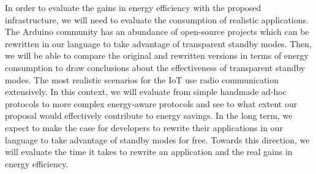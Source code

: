 \documentclass[12pt,english]{amsart}
\begin{document}
In order to evaluate the gains in energy efficiency with the proposed
infrastructure, we will need to evaluate the consumption of realistic applications.
%
The Arduino community has an abundance of open-source projects which can be
rewritten in our language to take advantage of transparent standby modes.
%
%
Then, we will be able to compare the original and rewritten versions in terms of energy
consumption to draw conclusions about the effectiveness of transparent standby
modes.
%
The most realistic scenarios for the IoT use radio communication extensively.
%
In this context, we will evaluate from simple handmade ad-hoc protocols to more
complex energy-aware protocols and see to what extent our proposal would
effectively contribute to energy savings.
%
%
%
In the long term, we expect to make the case for
developers to rewrite their applications in our language to take advantage of
standby modes for free.
%
Towards this direction, we will evaluate the time it takes to rewrite an application and
the real gains in energy efficiency.
%
\begin{comment}
\item[Time to rewrite:]
This criteria relates to the incentives to rewrite existing applications to
our language.
It is a tradeoff between the expected rewriting times and gains in energy
efficiency as compared to standard Arduino code.
\item[Coding ``aesthetics'':]
To lower the adoption barrier, it is also important that the proposed
programming style is sufficiently familiar, and, at least, as easy to write applications.
\item[Energy consumption:]
More importantly, rewritten applications should have significant gains in
energy efficiency to justify a complete application rewrite.
\end{comment}
\end{document}
